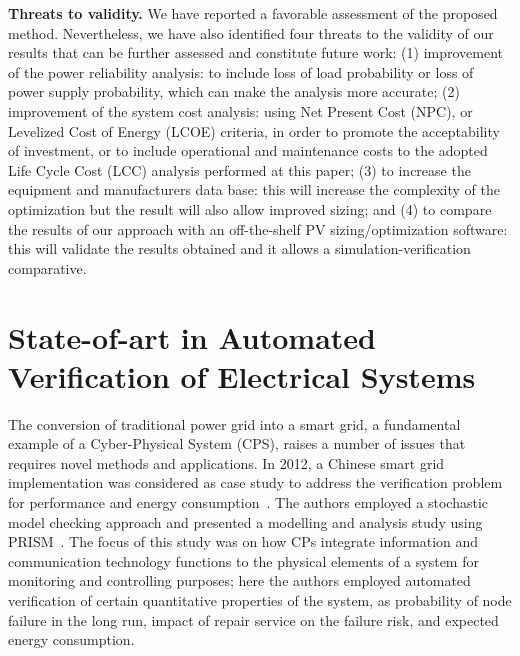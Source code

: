 \documentclass[runningheads]{llncs}
\begin{document}
\textbf{Threats to validity.}  We have reported a favorable assessment of the proposed method. Nevertheless, we have also identified four threats to the validity of our results that can be further assessed and constitute future work: (1) improvement of the power reliability analysis: to include loss of load probability or loss of power supply probability, which can make the analysis more accurate; (2) improvement of the system cost analysis: using Net Present Cost (NPC), or Levelized Cost of Energy (LCOE) criteria, in order to promote the acceptability of investment, or to include operational and maintenance costs to the adopted Life Cycle Cost (LCC) analysis performed at this paper; (3) to increase the equipment and manufacturers data base: this will increase the complexity of the optimization but the result will also allow improved sizing; and (4) to compare the results of our approach with an off-the-shelf PV sizing/optimization software: this will validate the results obtained and it allows a simulation-verification comparative.
%



\section{State-of-art in Automated Verification of Electrical Systems}

The conversion of traditional power grid into a smart grid, a fundamental example of a Cyber-Physical System (CPS), raises a number of issues that requires novel methods and applications. In 2012, a Chinese smart grid implementation was considered as case study to address the verification problem for performance and energy consumption~\cite{Yukseletall2012}. The authors employed a stochastic model checking approach and presented a modelling and analysis study using PRISM~\cite{KwiatkowskaNP11}. The focus of this study was on how CPs integrate information and communication technology functions to the physical elements of a system for monitoring and controlling purposes; here the authors employed automated verification of certain quantitative properties of the system, as 	probability	of	node	failure	in	the	long run, impact	of	repair	service	on	the	failure	risk, and expected energy consumption. %
\end{document}
